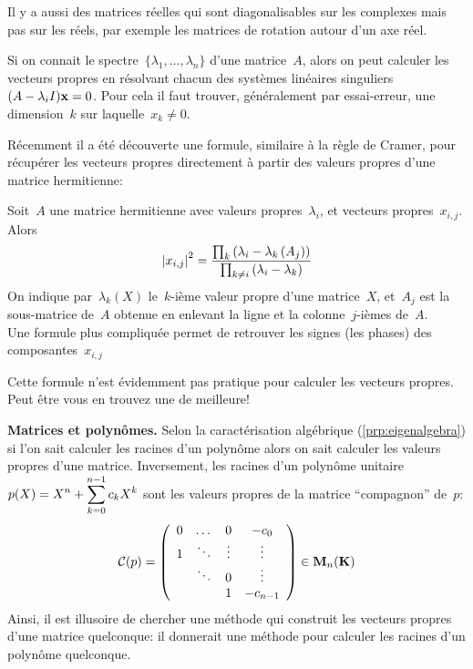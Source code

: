 Il y a aussi des matrices réelles qui sont diagonalisables sur les complexes
mais pas sur les réels, par exemple les matrices de rotation autour d'un axe
réel.

Si on connait le spectre~$\{\lambda_1,\ldots,\lambda_n\}$ d'une matrice~$A$,
alors on peut calculer les vecteurs propres en résolvant chacun des systèmes
linéaires singuliers~$(A-\lambda_i I)\mathbf{x}=0$.  Pour cela il faut trouver,
généralement par essai-erreur, une dimension~$k$ sur laquelle~$x_k\neq0$.

Récemment il a été découverte une formule, similaire à la règle de Cramer,
pour récupérer les vecteurs propres directement à partir des valeurs propres
d'une matrice hermitienne:

\begin{theorem}
	Soit~$A$ une matrice hermitienne avec valeurs
	propres~$\lambda_i$, et vecteurs propres~$x_{i,j}$.  Alors
	\[
		\left|x_{i,j}\right|^2
		=
		\frac
		{\prod_k\left(\lambda_i-\lambda_k\left(A_j\right)\right)}
		{\prod_{k\neq i}\left(\lambda_i-\lambda_k\right)}
	\]
	On indique par~$\lambda_k(X)$ le~$k$-ième valeur propre d'une matrice~$X$,
	et~$A_j$ est la sous-matrice de~$A$ obtenue en enlevant la ligne et la
	colonne~$j$-ièmes de~$A$.\\
	Une formule plus compliquée permet de retrouver les signes (les
	phases) des composantes~$x_{i,j}$
\end{theorem}

Cette formule n'est évidemment pas pratique pour calculer les vecteurs
propres.  Peut être vous en trouvez une de meilleure!

{\bf Matrices et polynômes.}
Selon la caractérisation algébrique (\ref{prp:eigenalgebra}) si l'on sait
calculer les racines d'un polynôme alors on sait calculer les valeurs propres
d'une matrice.  Inversement, les racines d'un polynôme unitaire~$\displaystyle
p(X)=X^n+\sum_{k=0}^{n-1} c_kX^k$ sont les valeurs propres de la matrice
``compagnon'' de~$p$:
\[
	\mathcal{C}(p)=
	\left(\begin{array}{cccc}
			0 & \dots & 0 & -c_0 \\
			1& \ddots &\vdots  & \vdots \\
			& \ddots & 0 & \vdots \\
			&  & 1 & -c_{{n-1}}
	\end{array}\right) \in\mathbf{M}_n(\mathbf{K})
\]
Ainsi, il est illusoire de chercher une méthode qui construit les vecteurs
propres d'une matrice quelconque: il donnerait une méthode pour calculer
les racines d'un polynôme quelconque.


